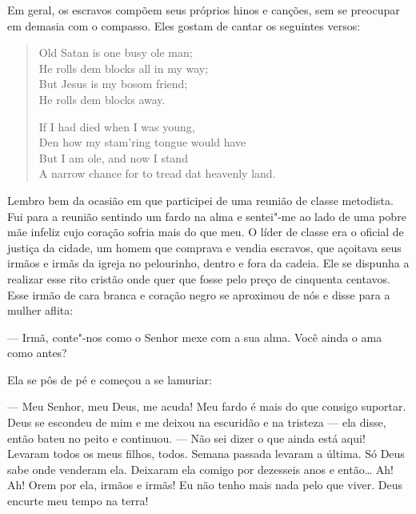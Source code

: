 Em geral, os escravos compõem seus
próprios hinos e canções, sem se preocupar em demasia com o compasso.
Eles gostam de cantar os seguintes versos:


\begin{verse}
Old Satan is one busy ole man;\\
He rolls dem blocks all in my way;\\
But Jesus is my bosom friend;\\
He rolls dem blocks away.

If I had died when I was young,\\
Den how my stam'ring tongue would have \\
But I am ole, and now I stand\\
A narrow chance for to tread dat heavenly \qb{}land.\footnotemark
\end{verse}

Lembro bem da ocasião em que participei
de uma reunião de classe metodista. Fui para a reunião sentindo um fardo
na alma e sentei"-me ao lado de uma pobre mãe infeliz cujo coração sofria
mais do que meu. O líder de classe era o oficial de justiça da cidade,
um homem que comprava e vendia escravos, que açoitava seus irmãos e
irmãs da igreja no pelourinho, dentro e fora da cadeia. Ele se dispunha
a realizar esse rito cristão onde quer que fosse pelo preço de cinquenta
centavos. Esse irmão de cara branca e coração negro se aproximou de nós
e disse para a mulher aflita:

--- Irmã, conte"-nos como o Senhor mexe com a sua alma. Você ainda o ama
como antes?

Ela se pôs de pé e começou a se
lamuriar:

--- Meu Senhor, meu Deus, me acuda! Meu fardo é mais do que consigo
suportar. Deus se escondeu de mim e me deixou na escuridão e na tristeza
--- ela disse, então bateu no peito e continuou. --- Não sei dizer o que
ainda está aqui! Levaram todos os meus filhos, todos. Semana passada
levaram a última. Só Deus sabe onde venderam ela. Deixaram ela comigo
por dezesseis anos e então\ldots{} Ah! Ah! Orem por ela, irmãos e irmãs!
Eu não tenho mais nada pelo que viver. Deus encurte meu tempo na terra!

